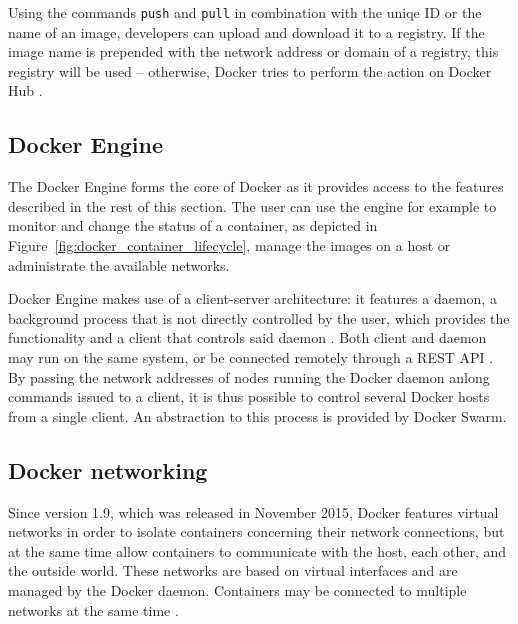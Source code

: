     Using the commands \texttt{push} and \texttt{pull} in combination with the uniqe \ac{ID} or the name of an image, developers can upload and download it to a registry. If the image name is prepended with the network address or domain of a registry, this registry will be used -- otherwise, Docker tries to perform the action on Docker Hub \cite{Docker2016Docker}.

  \subsection{Docker Engine} %
  \label{sub:docker_engine}

   The Docker Engine forms the core of Docker as it provides access to the features described in the rest of this section.
   The user can use the engine for example to monitor and change the status of a container, \eg as depicted in Figure~\ref{fig:docker_container_lifecycle}, manage the images on a host or administrate the available networks.

   Docker Engine makes use of a client-server architecture: it features a daemon, \ie a background process that is not directly controlled by the user, which provides the functionality and a client that controls said daemon \cite{Docker????DockerCom}. Both client and daemon may run on the same system, or be connected remotely through a \ac{REST} \ac{API} \cite{Docker2016Docker}. By passing the network addresses of nodes running the Docker daemon anlong commands issued to a client, it is thus possible to control several Docker hosts from a single client. An abstraction to this process is provided by Docker Swarm.


  \subsection{Docker networking} %
  \label{sub:docker_networks}
    Since version 1.9, which was released in November 2015, Docker features virtual networks in order to isolate containers concerning their network connections, but at the same time allow containers to communicate with the host, each other, and the outside world. These networks are based on virtual interfaces and are managed by the Docker daemon. Containers may be connected to multiple networks at the same time \cite{Docker2016Docker}.

